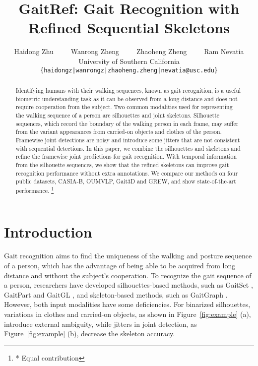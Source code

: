 \documentclass[10pt,twocolumn,letterpaper]{article}
\newcommand\blfootnote[1]{\begingroup 
\renewcommand\thefootnote{}\footnote{#1}\addtocounter{footnote}{-1}\endgroup 
}
\begin{document}
\title{GaitRef: Gait Recognition with Refined Sequential Skeletons}

\author{Haidong Zhu\ \ \ \ \ Wanrong Zheng\ \ \ \ \ Zhaoheng Zheng\ \ \ \ \ Ram Nevatia\\
University of Southern California\\
{\tt\small \{haidongz|wanrongz|zhaoheng.zheng|nevatia@usc.edu\}}
}

\maketitle
\thispagestyle{empty}


\begin{abstract}
Identifying humans with their walking sequences, known as gait recognition, is a useful biometric understanding task as it can be observed from a long distance and does not require cooperation from the subject. Two common modalities used for representing the walking sequence of a person are silhouettes and joint skeletons. Silhouette sequences, which record the boundary of the walking person in each frame, may suffer from the variant appearances from carried-on objects and clothes of the person. Framewise joint detections are noisy and introduce some jitters that are not consistent with sequential detections. In this paper, we combine the silhouettes and skeletons and refine the framewise joint predictions for gait recognition. With temporal information from the silhouette sequences, we show that the refined skeletons can improve gait recognition performance without extra annotations. We compare our methods on four public datasets, CASIA-B, OUMVLP, Gait3D and GREW, and show state-of-the-art performance.
\blfootnote{* Equal contribution}
\end{abstract} 
\section{Introduction}


Gait recognition \cite{he2018multi,song2019gaitnet,wu2016comprehensive,yu2017invariant} aims to find the uniqueness of the walking and posture sequence of a person, which has the advantage of being able to be acquired from long distance and without the subject's cooperation. To recognize the gait sequence of a person, researchers have developed silhouettes-based methods, such as GaitSet \cite{chao2019gaitset}, GaitPart \cite{fan2020gaitpart} and GaitGL \cite{lin2021gaitgl}, and skeleton-based methods, such as GaitGraph \cite{teepe2021gaitgraph}.
However, both input modalities have some deficiencies. For binarized silhouettes, variations in clothes and carried-on objects, as shown in Figure~\ref{fig:example} (a), introduce external ambiguity, while jitters in joint detection, as Figure~\ref{fig:example} (b), decrease the skeleton accuracy.
\end{document}
